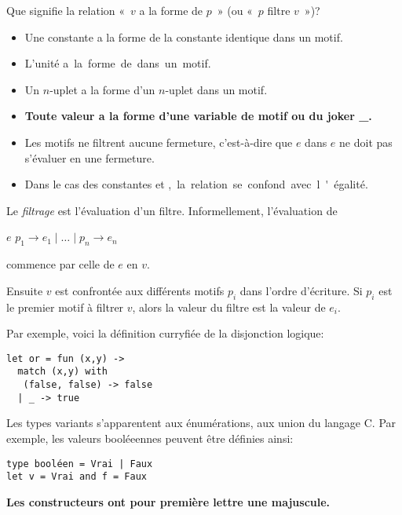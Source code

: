 Que signifie la relation «~$v$ a la forme de $p$~» (ou «~$p$ filtre
$v$~»)?
\begin{itemize}

  \item Une constante a la forme de la constante identique dans un
  motif.

  \item L'unité \unit a la forme de \unit dans un motif.

  \item Un $n$-uplet a la forme d'un $n$-uplet dans un motif.

  \item \textbf{Toute valeur a la forme d'une variable de motif ou du
  joker {\Large \_}.}

\end{itemize}

\remarques 

\begin{itemize}

\item Les motifs ne filtrent aucune fermeture, c'est-à-dire que $e$
  dans \Xmatch{} $e$ \Xwith{} ne doit pas s'évaluer en une fermeture.

  \item Dans le cas des constantes et \unit, la relation se confond
  avec l'égalité.

\end{itemize}

Le \emph{filtrage} est l'évaluation d'un filtre. Informellement,
l'évaluation de
 
\centerline{\Xmatch{} $e$ \Xwith{} $p_1 \rightarrow e_1 \mid \ldots
  \mid p_n \rightarrow e_n$} commence par celle de $e$ en $v$.

Ensuite $v$ est confrontée aux différents motifs $p_i$ dans l'ordre
d'écriture. Si $p_i$ est le premier motif à filtrer $v$, alors la
valeur du filtre est la valeur de $e_i$.

Par exemple, voici la définition curryfiée de la disjonction logique:
{\small
\begin{verbatim}
let or = fun (x,y) ->
  match (x,y) with
   (false, false) -> false
  | _ -> true
\end{verbatim}
}


Les types variants s'apparentent aux énumérations, aux \textsf{union}
du langage C. Par exemple, les valeurs booléeennes peuvent être
définies ainsi:
{\small
\begin{verbatim}
type booléen = Vrai | Faux
let v = Vrai and f = Faux
\end{verbatim}
}
\textbf{Les constructeurs ont pour première lettre une majuscule.}


